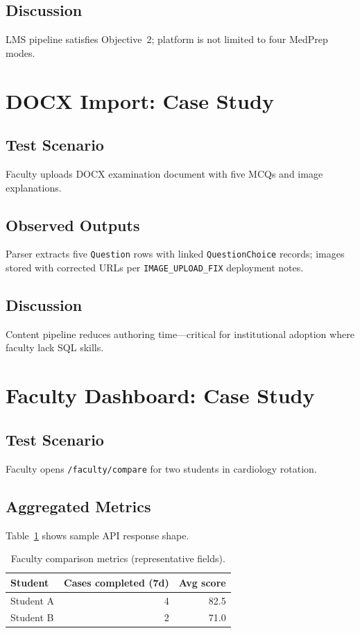 \subsection{Discussion}
LMS pipeline satisfies Objective~2; platform is not limited to four MedPrep modes.

\section{DOCX Import: Case Study}
\subsection{Test Scenario}
Faculty uploads DOCX examination document with five MCQs and image explanations.

\subsection{Observed Outputs}
Parser extracts five \texttt{Question} rows with linked \texttt{QuestionChoice} records; images stored with corrected URLs per \texttt{IMAGE\_UPLOAD\_FIX} deployment notes.

\subsection{Discussion}
Content pipeline reduces authoring time---critical for institutional adoption where faculty lack SQL skills.

\section{Faculty Dashboard: Case Study}
\subsection{Test Scenario}
Faculty opens \texttt{/faculty/compare} for two students in cardiology rotation.

\subsection{Aggregated Metrics}
Table~\ref{tab:faculty-metrics} shows sample API response shape.

\begin{table}[htbp]
  \centering
  \caption{Faculty comparison metrics (representative fields).}
  \label{tab:faculty-metrics}
  \small
  \begin{tabular}{@{}lrr@{}}
    \toprule
    \textbf{Student} & \textbf{Cases completed (7d)} & \textbf{Avg score} \\
    \midrule
    Student A & 4 & 82.5 \\
    Student B & 2 & 71.0 \\
    \bottomrule
  \end{tabular}
\end{table}


